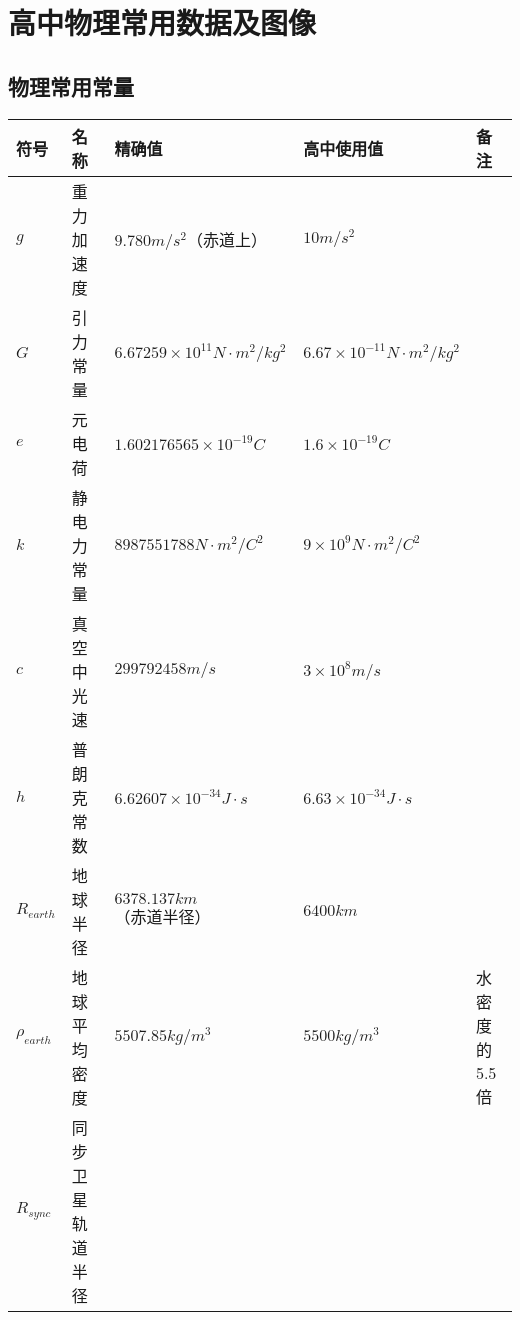 
\chapter{高中物理常用数据及图像}

\section{物理常用常量}

\begin{center}
\begin{tabular}{l|l|l|l|l}
\textbf{符号} & \textbf{名称} & \textbf{精确值} & \textbf{高中使用值} & \textbf{备注} \\
\hline
$g$ & 重力加速度 & $9.780 m/s^2$（赤道上） & $10m/s^2$ & \\
$G$ & 引力常量 & $6.67259 \times 10^{11} N \cdot m^2/kg^2$ & $6.67 \times 10^{-11} N \cdot m^2/kg^2$ & \\
$e$ & 元电荷 & $1.602176565 \times 10^{-19} C$ & $1.6 \times 10^{-19} C$ & \\ 
$k$ &  静电力常量 & $8987551788 N \cdot m^2 / C^2$ & $9 \times 10^{9} N \cdot m^2 /C^2$ & \\
$c$ & 真空中光速 & $299792458 m/s$ & $3 \times 10^{8} m/s$ & \\
$h$ & 普朗克常数 & $6.62607 \times 10^{-34} J \cdot s$ & $6.63 \times 10^{-34} J \cdot s$ & \\
\hline
$R_{earth}$ & 地球半径 & $6378.137 km$（赤道半径） & $6400 km$  & \\
$\rho_{earth}$ & 地球平均密度 & $5507.85 kg/m^3$ & $5500kg/m^3$ & 水密度的5.5倍 \\
$R_{sync}$ & 同步卫星轨道半径 &  &  & \\
\end{tabular}
\end{center}

